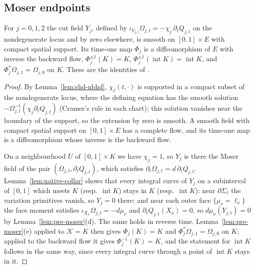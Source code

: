 \subsection{Moser endpoints}\label{sec:shd-moser}
\begin{proposition}\label{prop:shd-moser}
For $j=0,1,2$ the cut field $Y_j$, defined by $\iota_{Y_{j,t}}\Omega_{j,t}=-\chi_j\,\partial_tQ_{j,t}$ on the nondegenerate locus
and by zero elsewhere, is smooth on $[0,1]\times E$ with compact spatial support. Its time-one map $\Phi_j$ is a diffeomorphism
of $E$ with inverse the backward flow, $\Phi_j^{\pm1}(K)=K$, $\Phi_j^{\pm1}(\operatorname{int}K)=\operatorname{int}K$, and
$\Phi_j^*\Omega_{j,1}=\Omega_{j,0}$ on $K$. These are the identities of .
\end{proposition}
\begin{proof}
By Lemma~\ref{lem:shd-nbhd}, $\chi_j(t,\cdot)$ is supported in a compact subset of the nondegenerate locus, where the
defining equation has the smooth solution $-\Omega_{j,t}^{-1}(\chi_j\partial_tQ_{j,t})$ (Cramer's rule in each chart);
this solution vanishes near the boundary of the support, so the extension by zero is smooth. A smooth field with
compact spatial support on $[0,1]\times E$ has a complete flow, and its time-one map is a diffeomorphism whose inverse is the
backward flow.

On a neighbourhood $U$ of $[0,1]\times K$ we have $\chi_j=1$, so $Y_j$ is there the Moser field of the pair
$(\Omega_{j,t},\partial_tQ_{j,t})$, which satisfies $\partial_t\Omega_{j,t}=d\,\partial_tQ_{j,t}$. Lemma~\ref{lem:native-collar} shows
that every integral curve of $Y_j$ on a subinterval of $[0,1]$ which meets $K$ (resp.\ $\operatorname{int}K$) stays in $K$
(resp.\ $\operatorname{int}K$): near $\partial\Sigma_\ell$ the variation primitives vanish, so $Y_j=0$ there; and near each outer
face $\{\mu_\nu=\ell_\nu\}$ the face moment satisfies $\iota_{X_\nu}\Omega_{j,t}=-d\mu_\nu$ and $\partial_tQ_{j,t}(X_\nu)=0$, so
$d\mu_\nu(Y_{j,t})=0$ by Lemma~\ref{lem:pre-moser}(d). The same holds in reverse time. Lemma~\ref{lem:pre-moser}(e) applied to
$\mathcal K=K$ then gives $\Phi_j(K)=K$ and $\Phi_j^*\Omega_{j,1}=\Omega_{j,0}$ on $K$; applied to the backward flow it gives
$\Phi_j^{-1}(K)=K$, and the statement for $\operatorname{int}K$ follows in the same way, since every integral curve through a
point of $\operatorname{int}K$ stays in it.
\end{proof}

